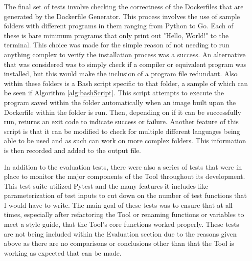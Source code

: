 The final set of tests involve checking the correctness of the Dockerfiles that are generated by the Dockerfile Generator. This process involves the use of sample folders with different programs in them ranging from Python to Go. Each of these is bare minimum programs that only print out "Hello, World!" to the terminal. This choice was made for the simple reason of not needing to run anything complex to verify the installation process was a success. An alternative that was considered was to simply check if a compiler or equivalent program was installed, but this would make the inclusion of a program file redundant. Also within these folders is a Bash script specific to that folder, a sample of which can be seen if Algorithm \ref{alg:bashScript}. This script attempts to execute the program saved within the folder automatically when an image built upon the Dockerfile within the folder is run. Then, depending on if it can be successfully run, returns an exit code to indicate success or failure. Another feature of this script is that it can be modified to check for multiple different languages being able to be used and as such can work on more complex folders. This information is then recorded and added to the output file.



In addition to the evaluation tests, there were also a series of tests that were in place to monitor the major components of the Tool throughout its development. This test suite utilized Pytest and the many features it includes like parameterization of test inputs to cut down on the number of test functions that I would have to write. The main goal of these tests was to ensure that at all times, especially after refactoring the Tool or renaming functions or variables to meet a style guide, that the Tool's core functions worked properly. These tests are not being included within the Evaluation section due to the reasons given above as there are no comparisons or conclusions other than that the Tool is working as expected that can be made.



